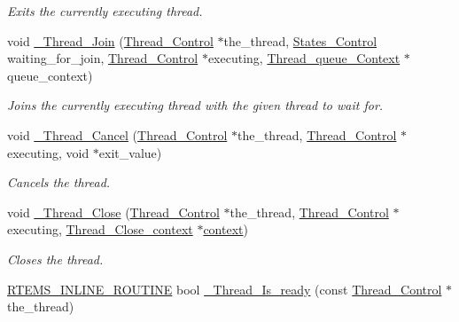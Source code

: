 \begin{DoxyCompactItemize}
\begin{DoxyCompactList}\small\item\em Exits the currently executing thread. \end{DoxyCompactList}\item 
void \mbox{\hyperlink{group__RTEMSScoreThread_ga659bc82bc257e001d0b94f10436fbab2}{\+\_\+\+Thread\+\_\+\+Join}} (\mbox{\hyperlink{struct__Thread__Control}{Thread\+\_\+\+Control}} $\ast$the\+\_\+thread, \mbox{\hyperlink{group__RTEMSScoreStates_gaeebbea0bfca162709b124fd519cf99d3}{States\+\_\+\+Control}} waiting\+\_\+for\+\_\+join, \mbox{\hyperlink{struct__Thread__Control}{Thread\+\_\+\+Control}} $\ast$executing, \mbox{\hyperlink{structThread__queue__Context}{Thread\+\_\+queue\+\_\+\+Context}} $\ast$queue\+\_\+context)
\begin{DoxyCompactList}\small\item\em Joins the currently executing thread with the given thread to wait for. \end{DoxyCompactList}\item 
void \mbox{\hyperlink{group__RTEMSScoreThread_gab1fb3719c77dc89881e4686fad81eeee}{\+\_\+\+Thread\+\_\+\+Cancel}} (\mbox{\hyperlink{struct__Thread__Control}{Thread\+\_\+\+Control}} $\ast$the\+\_\+thread, \mbox{\hyperlink{struct__Thread__Control}{Thread\+\_\+\+Control}} $\ast$executing, void $\ast$exit\+\_\+value)
\begin{DoxyCompactList}\small\item\em Cancels the thread. \end{DoxyCompactList}\item 
void \mbox{\hyperlink{group__RTEMSScoreThread_gaf42a844061758d4a5bda639ffc21b8f5}{\+\_\+\+Thread\+\_\+\+Close}} (\mbox{\hyperlink{struct__Thread__Control}{Thread\+\_\+\+Control}} $\ast$the\+\_\+thread, \mbox{\hyperlink{struct__Thread__Control}{Thread\+\_\+\+Control}} $\ast$executing, \mbox{\hyperlink{structThread__Close__context}{Thread\+\_\+\+Close\+\_\+context}} $\ast$\mbox{\hyperlink{sun4u_2tte_8h_a9b4a99475e2709333b8e5d70483173f1}{context}})
\begin{DoxyCompactList}\small\item\em Closes the thread. \end{DoxyCompactList}\item 
\mbox{\hyperlink{group__RTEMSScoreBaseDefs_gac216239df231d5dbd15e3520b0b9313f}{R\+T\+E\+M\+S\+\_\+\+I\+N\+L\+I\+N\+E\+\_\+\+R\+O\+U\+T\+I\+NE}} bool \mbox{\hyperlink{group__RTEMSScoreThread_gab4493fc6ffddc8fd05987cb405f9cf71}{\+\_\+\+Thread\+\_\+\+Is\+\_\+ready}} (const \mbox{\hyperlink{struct__Thread__Control}{Thread\+\_\+\+Control}} $\ast$the\+\_\+thread)

\end{DoxyCompactItemize}
